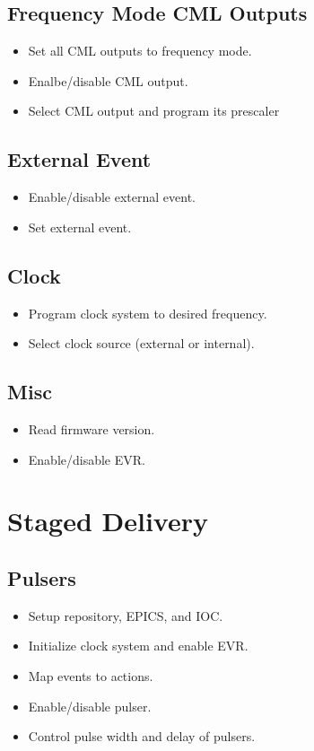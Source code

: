 \documentclass[a4paper,10pt]{article}
\begin{document}
	\subsection{Frequency Mode CML Outputs}
	\begin{itemize}
		\item Set all CML outputs to frequency mode.
		\item Enalbe/disable CML output.
		\item Select CML output and program its prescaler
	\end{itemize}

	\subsection{External Event}
	\begin{itemize}
		\item Enable/disable external event.
		\item Set external event.
	\end{itemize}

	\subsection{Clock}
	\begin{itemize}
		\item Program clock system to desired frequency.
		\item Select clock source (external or internal).
	\end{itemize}

	\subsection{Misc}
	\begin{itemize}
		\item Read firmware version.
		\item Enable/disable EVR.
	\end{itemize}

\section{Staged Delivery}
	\subsection{Pulsers}
	\begin{itemize}
		\item Setup repository, EPICS, and IOC.
		\item Initialize clock system and enable EVR.
		\item Map events to actions.
		\item Enable/disable pulser.
		\item Control pulse width and delay of pulsers.
	\end{itemize}
\end{document}
